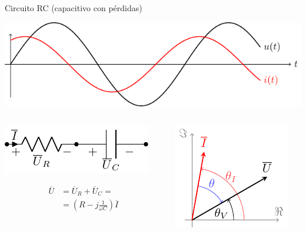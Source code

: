 \documentclass[xcolor={usenames,svgnames,dvipsnames}]{beamer}
\begin{document}
\begin{frame}[label={sec:orgdb40c5f}]{Circuito RC (capacitivo con pérdidas)}
\begin{center}
\includegraphics[height=0.25\textheight]{figs/capacitivo.pdf}
\end{center}


\begin{columns}
\begin{column}{0.45\columnwidth}
\begin{center}
\includegraphics[width=.9\linewidth]{figs/RC.pdf}
\end{center}

\begin{align*}
  \overline{U} &= \overline{U}_R + \overline{U}_C =\\
               &= (R - j \frac{1}{\omega C}) \overline{I} 
\end{align*}
\end{column}
\begin{column}{0.55\columnwidth}
\begin{center}
\includegraphics[height=0.45\textheight]{figs/fasorCondensadorReal_VI.pdf}
\end{center}
\end{column}
\end{columns}
\end{frame}
\end{document}
